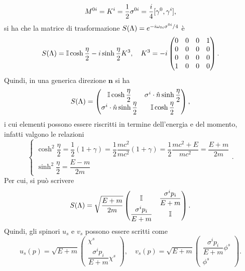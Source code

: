 \begin{equation}
    M^{0i} = K^i = \frac{1}{2}\sigma^{0i} = \frac{i}{4}[\gamma^0,\gamma^i],
\end{equation}
si ha che la matrice di trasformazione $S(\Lambda) = e^{-i\omega_{0i}\sigma^{0i}/4}$ è
\begin{equation}
    S(\Lambda) = \mathbb{I}\cosh{\frac{\eta}{2}} - i\sinh{\frac{\eta}{2}}K^3,\quad K^3 = -i
    \begin{pmatrix}
        0 & 0 & 0 & 1 \\
        0 & 0 & 0 & 0 \\
        0 & 0 & 0 & 0 \\
        1 & 0 & 0 & 0 \\
    \end{pmatrix}.
\end{equation}
Quindi, in una generica direzione $\bm{n}$ si ha
\begin{equation}
    S(\Lambda) = 
    \begin{pmatrix}
        \mathbb{I}\cosh{\dfrac{\eta}{2}} & \sigma^i\cdot\hat{n}\sinh{\dfrac{\eta}{2}} \\
        \sigma^i\cdot\hat{n}\sinh{\dfrac{\eta}{2}} & \mathbb{I}\cosh{\dfrac{\eta}{2}}
    \end{pmatrix},
\end{equation}
i cui elementi possono essere riscritti in termine dell'energia e del momento, infatti valgono le relazioni
\begin{equation}
    \begin{cases}
        \cosh^2{\dfrac{\eta}{2}} = \dfrac{1}{2}(1 + \gamma) = \dfrac{1}{2}\dfrac{mc^2}{mc^2}(1 + \gamma) = \dfrac{1}{2}\dfrac{mc^2 + E}{mc^2} = \dfrac{E + m}{2m} \\[2ex]
        \sinh^2{\dfrac{\eta}{2}} = \dfrac{E - m}{2m}
    \end{cases}.
\end{equation}
Per cui, si può scrivere
\begin{equation}
    S(\Lambda) = \sqrt{\frac{E + m}{2m}}
    \begin{pmatrix}
        \mathbb{I} & \dfrac{\sigma^ip_i}{E + m} \\
        \dfrac{\sigma^ip_i}{E + m} & \mathbb{I}
    \end{pmatrix}.
\end{equation}
Quindi, gli spinori $u_s$ e $v_s$ possono essere scritti come
\begin{equation}
\label{eq: spinori u e v in un SdR generico}
    u_s(p) = \sqrt{E + m}
    \begin{pmatrix}
        \chi^s \\
        \dfrac{\sigma^ip_i}{E + m}\chi^s
    \end{pmatrix},\quad v_s(p) = \sqrt{E + m}
    \begin{pmatrix}
        \dfrac{\sigma^ip_i}{E + m}\phi^s \\
        \phi^s
    \end{pmatrix}.
\end{equation}
